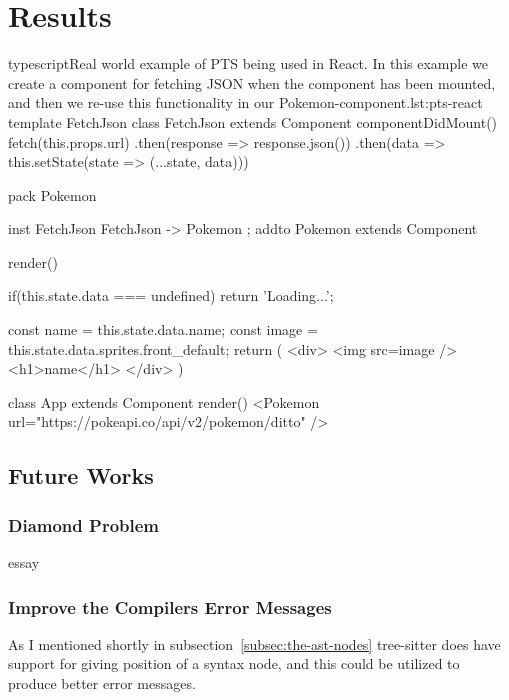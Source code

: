 \chapter{Results}\label{ch:results}

\begin{code}{typescript}{Real world example of PTS being used in React. In this example we create a component for fetching JSON when the component has been mounted, and then we re-use this functionality in our Pokemon-component.}{lst:pts-react}
    template FetchJson {
        class FetchJson extends Component {
            componentDidMount() {
                fetch(this.props.url)
                    .then(response => response.json())
                    .then(data =>
                        this.setState(state => ({...state, data})))
            }
        }
    }

    pack Pokemon {
        inst FetchJson { FetchJson -> Pokemon };
        addto Pokemon extends Component {
            render() {
                if(this.state.data === undefined)
                    return 'Loading...';

                const name = this.state.data.name;
                const image = this.state.data.sprites.front_default;
                return (
                    <div>
                        <img src={image} />
                        <h1>{name}</h1>
                    </div>
                )
            }
        }

        class App extends Component {
            render() {
                <Pokemon url="https://pokeapi.co/api/v2/pokemon/ditto" />
            }
        }
    }
\end{code}

\section{Future Works}\label{sec:future-works}

\subsection{Diamond Problem}\label{subsec:diamond-problem}

essay

\subsection{Improve the Compilers Error Messages}\label{subsec:compiler-with-focus-on-error-messages}

As I mentioned shortly in subsection~\vref{subsec:the-ast-nodes} tree-sitter does have support for giving position of a syntax node, and this could be utilized to produce better error messages.
